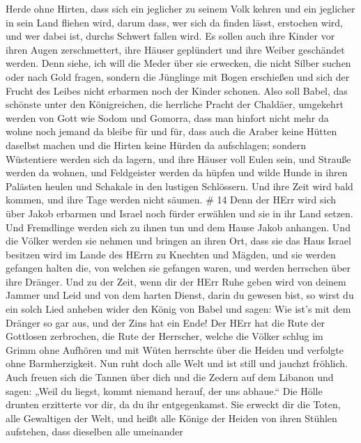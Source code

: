 Herde ohne Hirten, dass sich ein jeglicher zu seinem Volk kehren und ein
jeglicher in sein Land fliehen wird,  darum dass, wer sich
da finden lässt, erstochen wird, und wer dabei ist, durchs Schwert
fallen wird.  Es sollen auch ihre Kinder vor ihren Augen
zerschmettert, ihre Häuser geplündert und ihre Weiber geschändet werden.
 Denn siehe, ich will die Meder über sie erwecken, die
nicht Silber suchen oder nach Gold fragen,  sondern die
Jünglinge mit Bogen erschießen und sich der Frucht des Leibes nicht
erbarmen noch der Kinder schonen.  Also soll Babel, das
schönste unter den Königreichen, die herrliche Pracht der Chaldäer,
umgekehrt werden von Gott wie Sodom und Gomorra,  dass man
hinfort nicht mehr da wohne noch jemand da bleibe für und für, dass auch
die Araber keine Hütten daselbst machen und die Hirten keine Hürden da
aufschlagen;  sondern Wüstentiere werden sich da lagern,
und ihre Häuser voll Eulen sein, und Strauße werden da wohnen, und
Feldgeister werden da hüpfen  und wilde Hunde in ihren
Palästen heulen und Schakale in den lustigen Schlössern. Und ihre Zeit
wird bald kommen, und ihre Tage werden nicht säumen. \# 14 
Denn der HErr wird sich über Jakob erbarmen und Israel noch fürder
erwählen und sie in ihr Land setzen. Und Fremdlinge werden sich zu ihnen
tun und dem Hause Jakob anhangen.  Und die Völker werden sie
nehmen und bringen an ihren Ort, dass sie das Haus Israel besitzen wird
im Lande des HErrn zu Knechten und Mägden, und sie werden gefangen
halten die, von welchen sie gefangen waren, und werden herrschen über
ihre Dränger.  Und zu der Zeit, wenn dir der HErr Ruhe geben
wird von deinem Jammer und Leid und von dem harten Dienst, darin du
gewesen bist,  so wirst du ein solch Lied anheben wider den
König von Babel und sagen: Wie ist's mit dem Dränger so gar aus, und der
Zins hat ein Ende!  Der HErr hat die Rute der Gottlosen
zerbrochen, die Rute der Herrscher,  welche die Völker
schlug im Grimm ohne Aufhören und mit Wüten herrschte über die Heiden
und verfolgte ohne Barmherzigkeit.  Nun ruht doch alle Welt
und ist still und jauchzt fröhlich.  Auch freuen sich die
Tannen über dich und die Zedern auf dem Libanon und sagen: „Weil du
liegst, kommt niemand herauf, der uns abhaue.``  Die Hölle
drunten erzitterte vor dir, da du ihr entgegenkamst. Sie erweckt dir die
Toten, alle Gewaltigen der Welt, und heißt alle Könige der Heiden von
ihren Stühlen aufstehen,  dass dieselben alle umeinander
